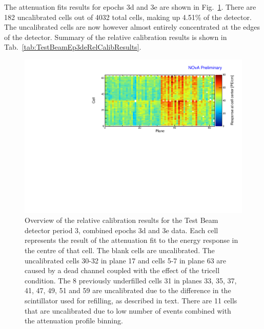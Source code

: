 The attenuation fits results for epochs 3d and 3e are shown in Fig.~\ref{fig:CellCentreResponseEp3de}. There are 182 uncalibrated cells out of 4032 total cells, making up 4.51\% of the detector. The uncalibrated cells are now however almost entirely concentrated at the edges of the detector. Summary of the relative calibration results is shown in Tab.~\ref{tab:TestBeamEp3deRelCalibResults}.

\begin{figure}[!hbtp]
\centering
\includegraphics[width=\textwidth]{Plots/TBCalibration/CellResponseAtCentre_epoch3de_original_Limited_NOvAPlotStyle.pdf}
\caption[Map of fitted response at cell centre for epochs 3d and 3e data]{Overview of the relative calibration results for the Test Beam detector period 3, combined epochs 3d and 3e data. Each cell represents the result of the attenuation fit to the energy response in the centre of that cell. The blank cells are uncalibrated. The uncalibrated cells 30-32 in plane 17 and cells 5-7 in plane 63 are caused by a dead channel coupled with the effect of the tricell condition. The 8 previously underfilled cells 31 in planes 33, 35, 37, 41, 47, 49, 51 and 59 are uncalibrated due to the difference in the scintillator used for refilling, as described in text. There are 11 cells that are uncalibrated due to low number of events combined with the attenuation profile binning.}
\label{fig:CellCentreResponseEp3de}
\end{figure}

